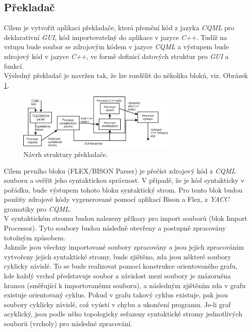 \documentclass[11pt,twoside,a4paper]{book}
\begin{document}
{{\begin{ttemize}
{{\section{Překladač}
Cílem je vytvořit aplikaci překladače, která přemění kód z jazyka \textit{CQML} pro deklarativní \textit{GUI}, kód importovatelný do aplikace v jazyce \textit{C++}. Tudíž na vstupu bude soubor se zdrojovým kódem v jazyce \textit{CQML} a výstupem bude zdrojový kód v jazyce \textit{C++}, ve formě definicí datových struktur pro \textit{GUI} a funkcí. \\
Výsledný překladač je navržen tak, že lze rozdělit do několika bloků, viz. Obrázek \ref{fig:fig1}.\\
\begin{figure}[!ht]
\begin{center}
  \includegraphics[width=0.7\textwidth]{parserdiag}
\caption{{\label{fig:fig1}}Návrh struktury překladače.}
\end{center}
\end{figure}
Cílem prvního bloku (FLEX/BISON Parser) je přečíst zdrojový kód z \textit{CQML} souboru a ověřit jeho syntaktickou správnost. V případě, že je kód syntakticky v pořádku, bude výstupem tohoto bloku syntaktický strom. Pro tento blok budou použity zdrojové kódy vygenerované pomocí aplikací Bison a Flex, z \textit{YACC} gramatiky pro \textit{CQML}.\\
V syntaktickém stromu budou nalezeny příkazy pro import souborů (blok Import Processor). Tyto soubory budou následně otevřeny a postupně zpracovány totožným způsobem.\\
Jakmile jsou všechny importované soubory zpracovány a jsou jejich zpracováním vytvořeny jejich syntaktické stromy, bude zjištěno, zda jsou některé soubory cyklicky závislé. To se bude realizovat pomocí konstrukce orientovaného grafu, kde každý vrchol představuje soubor a závislost mezi soubory je znázorněna hranou (směřující k importovanému souboru), a následným zjištěním zda v grafu existuje orientovaný cyklus. Pokud v grafu takový cyklus existuje, pak jsou soubory cyklicky závislé, což vyústí v chybu a ukončení programu. Je-li graf acyklický, jsou podle něho topologicky seřazeny syntaktické stromy jednotlivých souborů (vrcholy) pro následné zpracování.\\
}}
\end{ttemize}}}
\end{document}
